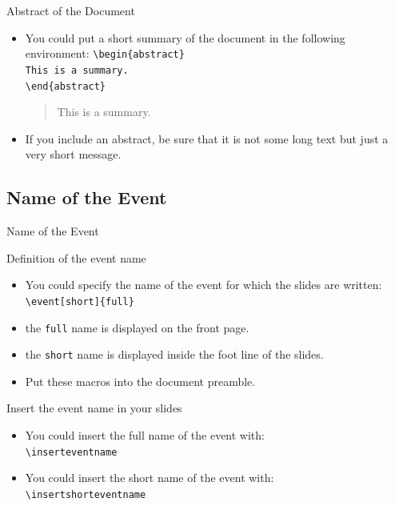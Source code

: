 \documentclass[english,sectioncirclenumberstyle]{ciadbeamer}
\begin{document}
\begin{frame}{Abstract of the Document}
	\begin{itemize}
	\item You could put a short summary of the document in the following environment:
		\texttt{{\textbackslash}begin\{abstract\}} \\
		\texttt{This is a summary.} \\
		\texttt{{\textbackslash}end\{abstract\}}
	\vspace{1em}
	\begin{abstract}
		This is a summary.
	\end{abstract}
	\item If you include an abstract, be sure that it is not some long text but just a very short message.
	\end{itemize}
\end{frame}

\subsection{Name of the Event}

\begin{frame}[t]{Name of the Event}
	\begin{block}{Definition of the event name}
		\begin{itemize}
		\item You could specify the name of the event for which the slides are written: \\
			\texttt{{\textbackslash}event[short]\{full\}}
		\item the \texttt{full} name is displayed on the front page.
		\item the \texttt{short} name is displayed inside the foot line of the slides.
		\item Put these macros into the document preamble.
		\end{itemize}
	\end{block}
	\begin{block}{Insert the event name in your slides}
		\begin{itemize}
		\item You could insert the full name of the event with: \\
			\texttt{{\textbackslash}inserteventname}
		\item You could insert the short name of the event with: \\
			\texttt{{\textbackslash}insertshorteventname}
		\end{itemize}
	\end{block}
\end{frame}
\end{document}
